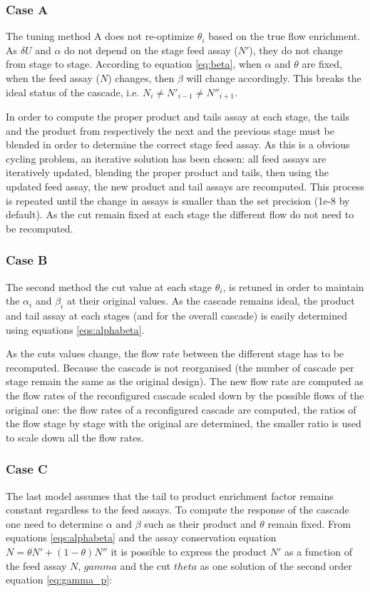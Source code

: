 \subsubsection{Case A}
The tuning method A does not re-optimize $\theta_i$ based on the true flow
enrichment. As $\delta U$ and $\alpha$ do not depend on the stage feed assay
($N'$), they do not change from stage to stage. According to equation
\eqref{eq:beta}, when $\alpha$ and $\theta$ are fixed, when the feed assay ($N$)
changes, then $\beta$ will change accordingly.  This breaks the ideal status of
the cascade, i.e.  $N_{i} \neq N'_{i-1} \neq N''_{i+1}$.

In order to compute the proper product and tails assay at each stage, the
tails and the product from respectively the next and the previous stage must be
blended in order to determine the correct stage feed assay. As this is a obvious
cycling problem, an iterative solution has been chosen: all feed assays are
iteratively updated, blending the proper product and tails, then using the
updated feed assay, the new product and tail assays are recomputed. This process
is repeated until the change in assays is smaller than the set precision (1e-8
by default).
As the cut remain fixed at each stage the different flow do not need to be
recomputed.


\subsubsection{Case B}

The second method the cut value at each stage $\theta_i$, is retuned in order to
maintain the $\alpha_i$ and $\beta_i$ at their original values. As the cascade
remains ideal, the product and tail assay at each stages (and for the overall
cascade) is easily determined using equations \eqref{eqs:alphabeta}.

As the cuts values change, the flow rate between the different stage has to be
recomputed. Because the cascade is not reorganised (the number of cascade per
stage remain the same as the original design). The new flow rate are computed as
the flow rates of the reconfigured cascade scaled down by the possible
flows of the original one: the flow rates of a reconfigured cascade are
computed, the ratios of the flow stage by stage with the original are determined,
the smaller ratio is used to scale down all the flow rates.

\subsubsection{Case C}
The last model assumes that the tail to product enrichment factor remains
constant regardless to the feed assays. To compute the response of the cascade
one need to determine $\alpha$ and $\beta$ such as their product and
$\theta$ remain fixed. 
From equations \eqref{eqs:alphabeta} and the assay conservation equation $N =
\theta N' + (1-\theta)N''$ it is possible to express the product $N'$ as a function of
the feed assay $N$, $gamma$ and the cut $theta$ as one solution of the second
order equation \eqref{eq:gamma_p}:

